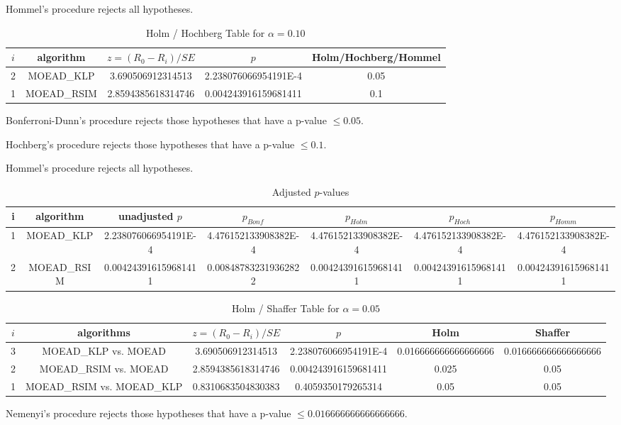 \documentclass[a4paper,10pt]{article}
\begin{document}
\begin{landscape}
Hommel's procedure rejects all hypotheses.


\begin{table}[!htp]
\centering\tiny
\caption{Holm / Hochberg Table for $\alpha=0.10$}
\begin{tabular}{ccccc}
$i$&algorithm&$z=(R_0 - R_i)/SE$&$p$&Holm/Hochberg/Hommel\\
\hline
2&MOEAD_KLP&3.690506912314513&2.238076066954191E-4&0.05\\
1&MOEAD_RSIM&2.8594385618314746&0.004243916159681411&0.1\\
\hline
\end{tabular}
\end{table}
Bonferroni-Dunn's procedure rejects those hypotheses that have a p-value $\le0.05$.


Hochberg's procedure rejects those hypotheses that have a p-value $\le0.1$.


Hommel's procedure rejects all hypotheses.


\begin{table}[!htp]
\centering\tiny
\caption{Adjusted $p$-values}
\begin{tabular}{ccccccc}
i&algorithm&unadjusted $p$&$p_{Bonf}$&$p_{Holm}$&$p_{Hoch}$&$p_{Homm}$\\
\hline
1&MOEAD_KLP&2.238076066954191E-4&4.476152133908382E-4&4.476152133908382E-4&4.476152133908382E-4&4.476152133908382E-4\\
2&MOEAD_RSIM&0.004243916159681411&0.008487832319362822&0.004243916159681411&0.004243916159681411&0.004243916159681411\\
\hline
\end{tabular}
\end{table}

\begin{table}[!htp]
\centering\tiny
\caption{Holm / Shaffer Table for $\alpha=0.05$}
\begin{tabular}{cccccc}
$i$&algorithms&$z=(R_0 - R_i)/SE$&$p$&Holm&Shaffer\\
\hline
3&MOEAD_KLP vs. MOEAD&3.690506912314513&2.238076066954191E-4&0.016666666666666666&0.016666666666666666\\
2&MOEAD_RSIM vs. MOEAD&2.8594385618314746&0.004243916159681411&0.025&0.05\\
1&MOEAD_RSIM vs. MOEAD_KLP&0.8310683504830383&0.4059350179265314&0.05&0.05\\
\hline
\end{tabular}
\end{table}
Nemenyi's procedure rejects those hypotheses that have a p-value $\le0.016666666666666666$.



\end{landscape}
\end{document}
